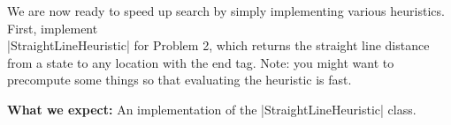 \item {}

We are now ready to speed up search by simply implementing various heuristics. First, implement \\
|StraightLineHeuristic| for Problem 2, which returns the straight line distance from a state to any location with the end tag. Note: you might want to precompute some things so that evaluating the heuristic is fast.

\textbf{What we expect: } An implementation of the |StraightLineHeuristic| class.

